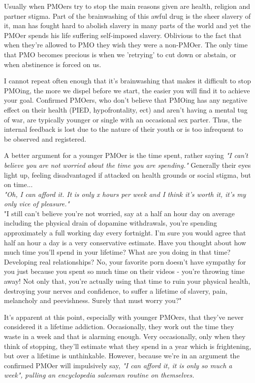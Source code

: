 \documentclass[easypeasy.tex]{subfiles}
\begin{document}
Usually when PMOers try to stop the main reasons given are health, religion and partner stigma. Part of the brainwashing of this awful drug is the sheer slavery of it, man has fought hard to abolish slavery in many parts of the world and yet the PMOer spends his life suffering self-imposed slavery. Oblivious to the fact that when they're allowed to PMO they wish they were a non-PMOer. The only time that PMO becomes precious is when we 'retrying' to cut down or abstain, or when abstinence is forced on us.

I cannot repeat often enough that it's brainwashing that makes it difficult to stop PMOing, the more we dispel before we start, the easier you will find it to achieve your goal. Confirmed PMOers, who don't believe that PMOing has any negative effect on their health (PIED, hypofrontality, ect) and aren't having a mental tug of war, are typically younger or single with an occasional sex parter. Thus, the internal feedback is lost due to the nature of their youth or is too infrequent to be observed and registered.

A better argument for a younger PMOer is the time spent, rather saying \textit{"I can't believe you are not worried about the time you are spending."} Generally their eyes light up, feeling disadvantaged if attacked on health grounds or social stigma, but on time...\\
  \textit{"Oh, I can afford it. It is only x hours per week and I think it's worth it, it's my only vice of pleasure."}\\
  "I still can't believe you're not worried, say at a half an hour day on average including the physical drain of dopamine withdrawals, you're spending approximately a full working day every fortnight. I'm sure you would agree that half an hour a day is a very conservative estimate. Have you thought about how much time you'll spend in your lifetime? What are you doing in that time? Developing real relationships? No, your favorite porn doesn't have sympathy for you just because you spent so much time on their videos - you're throwing time away! Not only that, you're actually using that time to ruin your physical health, destroying your nerves and confidence, to suffer a lifetime of slavery, pain, melancholy and peevishness. Surely that must worry you?"

It's apparent at this point, especially with younger PMOers, that they've never considered it a lifetime addiction. Occasionally, they work out the time they waste in a week and that is alarming enough. Very occasionally, only when they think of stopping, they'll estimate what they spend in a year which is frightening, but over a lifetime is unthinkable. However, because we're in an argument the confirmed PMOer will impulsively say, \textit{"I can afford it, it is only so much a week", pulling an encyclopedia salesman routine on themselves.}
\end{document}
